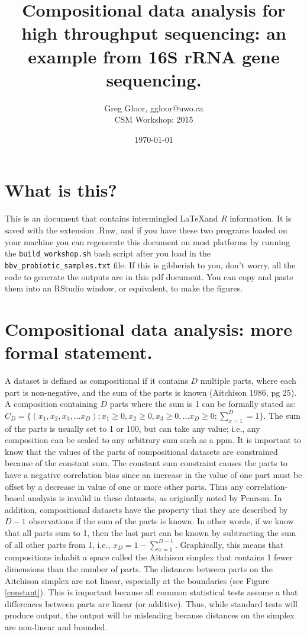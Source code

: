 \documentclass[11pt]{article}\usepackage[]{graphicx}\usepackage[]{color}
\title{Compositional data analysis for high throughput sequencing: an example from 16S rRNA gene sequencing.}
\author{Greg Gloor, ggloor@uwo.ca\\CSM Workshop: 2015}
\date{\today}                                           %
\begin{document}
\maketitle
\tableofcontents
\section{What is this?} 
This is an document that contains intermingled \LaTeX and \emph{R} information. It is saved with the extension .Rnw, and if you have these two programs loaded on your machine you can regenerate this document on most platforms by running the {\tt build\_workshop.sh} bash script after you load in the {\tt bbv\_probiotic\_samples.txt} file. If this is gibberish to you, don't worry, all the code to generate the outputs are in this pdf document. You can copy and paste them into an RStudio window, or equivalent, to make the figures.
  
\section{Compositional data analysis: more formal statement.}
A dataset is defined as compositional if it contains $D$ multiple parts, where each part is non-negative, and the sum of the parts is known (Aitchison 1986, pg 25). A composition containing $D$ parts where the sum is 1 can be formally stated as: $C_D = \{(x_1,x_2,x_3, \ldots x_D); x_1\ge 0, x_2\ge 0, x_3 \ge 0, \ldots x_D \ge 0; \sum_{x=1}^{D} = 1\}$. The sum of the parts is usually set to 1 or 100, but can take any value; i.e., any composition can be scaled to any arbitrary sum such as a ppm.  It is important to know that the values of the parts of compositional datasets are constrained because of the constant sum. The constant sum constraint causes the parts to have a negative correlation bias since an increase in the value of one part must be offset by a decrease in value of one or more other parts. Thus any correlation-based analysis is invalid in these datasets, as originally noted by Pearson\cite{Pearson:1896}. In addition, compositional datasets have the property that they are described by $D-1$ observations if the sum of the parts is known\cite{Aitchison:1986}. In other words, if we know that all parts sum to 1, then the last part can be known by subtracting the sum of all other parts from 1, i.e., $x_D = 1-\sum_{x=1}^{D-1}$. Graphically, this means that compositions inhabit a space called the Aitchison simplex that contains 1 fewer dimensions than the number of parts. The distances between parts on the Aitchison simplex are not linear, especially at the boundaries (see Figure \ref{constant}). This is important because all common statistical tests assume a that differences between parts are linear (or additive). Thus, while standard tests will produce output, the output will be misleading because distances on the simplex are non-linear and bounded\cite{martin1998measures}. 
\end{document}
